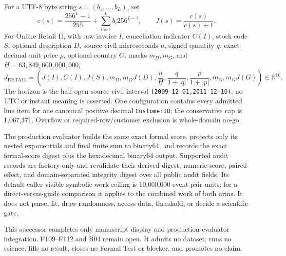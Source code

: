 For a UTF-8 byte string $s=(b_1,\ldots,b_L)$, set
\[
c(s)=\frac{256^L-1}{255}+\sum_{i=1}^{L}b_i256^{L-i},
\qquad J(s)=\frac{c(s)}{c(s)+1}.
\]
For Online Retail II, with raw invoice $I$, cancellation indicator $C(I)$,
stock code $S$, optional description $D$, source-civil microseconds $u$, signed
quantity $q$, exact-decimal unit price $p$, optional country $G$, masks
$m_D,m_G$, and $H=63{,}849{,}600{,}000{,}000$,
\[
J_{\mathrm{RETAIL}}=\left(
J(I),C(I),J(S),m_D,m_DJ(D),\frac{u}{H},
\frac{q}{1+|q|},\frac{p}{1+|p|},m_G,m_GJ(G)
\right)\in\mathbb R^{10}.
\]
The horizon is the half-open source-civil interval
\texttt{[2009-12-01,2011-12-10)}; no UTC or instant meaning is asserted. One
configuration contains every admitted line item for one canonical positive
decimal \texttt{CustomerID}; the conservative cap is 1,067,371. Overflow or
required-row/customer exclusion is whole-domain no-go.

The production evaluator builds the same exact formal score, projects only its
nested exponentials and final finite sum to binary64, and records the exact
formal-score digest plus the hexadecimal binary64 output. Supported audit
records are factory-only and revalidate their derived digest, numeric score,
paired effect, and domain-separated integrity digest over all public audit
fields. Its default caller-visible symbolic work ceiling is
10,000,000 event-pair units; for a direct-versus-guide comparison it applies
to the combined work of both arms. It does
not parse, fit, draw randomness, access data, threshold, or decide a scientific
gate.

This successor completes only manuscript display and production evaluator
integration. F109--F112 and B04 remain open. It admits no dataset, runs no
science, fills no result, closes no Formal Test or blocker, and promotes no
claim.
